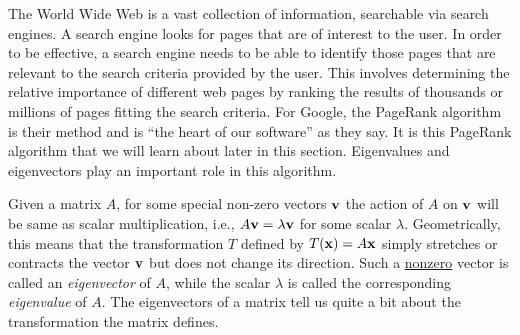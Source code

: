  \label{sec:intro_eigenvals_eigenvects}

\vspace*{-17 pt}

\vspace*{13 pt}

The World Wide Web is a vast collection of information, searchable via search engines. A search engine looks for pages that are of interest to the user. In order to be effective, a search engine needs to be able to identify those pages that are relevant to the search criteria provided by the user. This involves determining the relative importance of different web pages by ranking the results of thousands or millions of pages fitting the search criteria. For Google, the PageRank algorithm is their method and is ``the heart of our software'' as they say. It is this PageRank algorithm that we will learn about later in this section. Eigenvalues and eigenvectors play an important role in this algorithm.


Given a matrix $A$, for some special non-zero vectors $\mathbf{v}$ the action of $A$ on $\mathbf{v}$ will be same as scalar multiplication, i.e., $A\mathbf{v}=\lambda \mathbf{v}$ for some scalar $\lambda$. Geometrically, this means that the transformation $T$ defined by $T(\mathbf{x}) = A\mathbf{x}$ simply stretches or contracts the vector $\mathbf{v}$ but does not change its direction. Such a \underline{nonzero} vector is called an \emph{eigenvector} of $A$, while the scalar $\lambda$ is called the corresponding \emph{eigenvalue} of $A$. The eigenvectors of a matrix tell us quite a bit about the transformation the matrix defines. 

